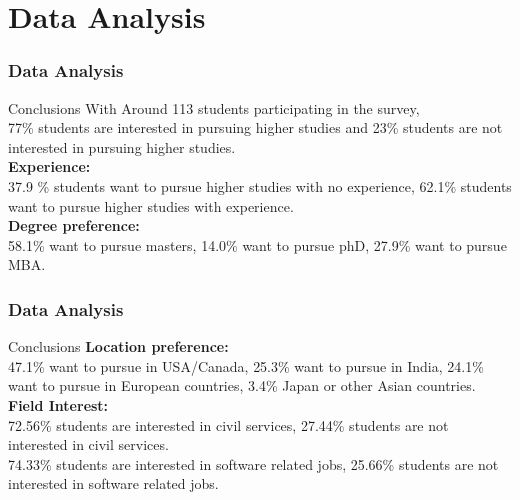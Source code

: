 \documentclass{beamer}
\begin{document}
\section{Data Analysis}
\begin{frame}
  \frametitle{Data Analysis}
  \begin{block}{Conclusions}
    With Around 113 students participating in the survey,\\ 77\% students are interested in pursuing higher studies and 23\% students are not interested in pursuing higher studies.\\
    {\textbf{Experience:}}\\
    37.9 \% students want to pursue higher studies with no experience, 62.1\% students want to pursue higher studies with experience.\\
    {\textbf{Degree preference:}}\\
    58.1\% want to pursue masters, 14.0\% want to pursue phD, 27.9\% want to pursue MBA.\\
  \end{block}
\end{frame}

\begin{frame}
  \frametitle{Data Analysis}
  \begin{block}{Conclusions}
    {\textbf{Location preference:}}\\
    47.1\% want to pursue in USA/Canada, 25.3\% want to pursue in India, 24.1\% want to pursue in European countries, 3.4\% Japan or other Asian countries.\\
    {\textbf{Field Interest:}}\\
    72.56\% students are interested in civil services, 27.44\% students are not interested in civil services.\\
    74.33\% students are interested in software related jobs, 25.66\% students are not interested in software related jobs.
  \end{block}
\end{frame}
\end{document}

